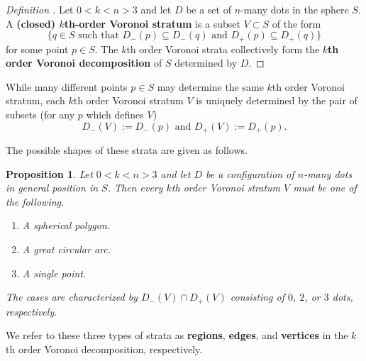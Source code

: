 \documentclass[11pt,oneside]{amsart}
\newtheorem{prop}[thm]{Proposition}
\theoremstyle{definition}
\theoremstyle{remark}
\newenvironment{defn}{\refstepcounter{thm}\begin{proof}[Definition \emph{\thethm}]\renewcommand*{\qedsymbol}{\(\blacksquare\)}}{\end{proof}}
\numberwithin{equation}{section}
\begin{document}
\begin{defn}
Let $0<k<n>3$ and let $D$ be a set of $n$-many dots in the sphere $S$. A \textbf{(closed) $k$th-order Voronoi stratum} is a subset $V\subset S$ of the form 
\[
\{ q\in S \text{ such that $D_-(p)\subseteq D_-(q)$ and $D_+(p)\subseteq D_+(q)$}\}
\]
for some point $p\in S$. The $k$th order Voronoi strata collectively form the \textbf{$k$th order Voronoi decomposition} of $S$ determined by $D$.
\end{defn}


While many different points $p\in S$ may determine the same $k$th order Voronoi stratum, each $k$th order Voronoi stratum $V$ is uniquely determined by the pair of subsets (for any $p$ which defines $V$)
\begin{equation}\label{eq: Voronoisets}
D_-(V) := D_-(p)
\text{ and }
D_+(V) := D_+(p).
\end{equation}

The possible shapes of these strata are given as follows.

\begin{prop}\label{prop: stratumtypes}
Let $0<k<n>3$ and let $D$ be a configuration of $n$-many dots in general position in $S$. Then every $k$th order Voronoi stratum $V$ must be one of the following.
\begin{enumerate}
    \item A spherical polygon.
    \item A great circular arc.
    \item A single point.
\end{enumerate}
The cases are characterized by $D_-(V)\cap D_+(V)$ consisting of $0$, $2$, or $3$ dots, respectively.
\end{prop}

\noindent We refer to these three types of strata as \textbf{regions}, \textbf{edges}, and \textbf{vertices} in the $k$th order Voronoi decomposition, respectively. 
\end{document}
